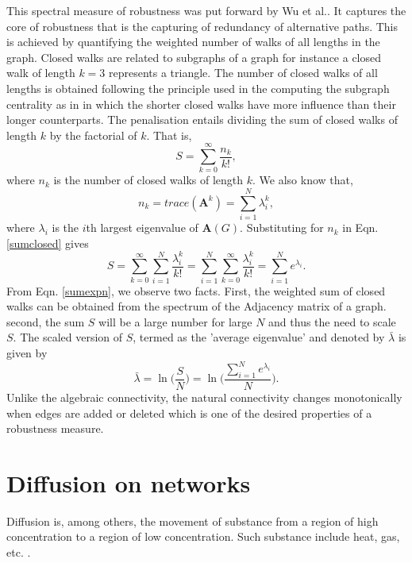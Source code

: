 \documentclass[10pt,a4paper]{article}
\begin{document}
\begin{enumerate}
		This spectral measure of robustness was put forward by Wu et al.\citep{wu2564spectral}. It captures the core of robustness that is the capturing of redundancy of alternative paths. This is achieved by quantifying the weighted number of walks of all lengths in the graph. Closed walks are related to subgraphs of a graph for instance a closed walk of length $k=3$ represents a triangle. The number of closed walks of all lengths is obtained following the principle used in the computing the subgraph centrality as in \citep{estrada2011structure} in which the shorter closed walks have more influence than their longer counterparts. The penalisation entails dividing the sum of closed walks of length $k$ by the factorial of $k$. That is,  
		\begin{equation}
		S = \sum_{k=0}^{\infty} \frac{n_k}{k!},
		\label{sumclosed}
		\end{equation} 
		where $n_k$ is the number of closed walks of length $k$. We also know that,
		\begin{equation}
		n_k = trace(\mathbf{A}^k) = \sum_{i=1}^{N} \lambda_{i} ^k,
		\end{equation}
		where $\lambda_i$ is the $i$th largest eigenvalue of $\mathbf{A}(G)$.
		Substituting for $n_k$ in Eqn.\ref{sumclosed} gives
		\begin{equation}
		S = \sum_{k=0}^{\infty} \sum_{i=1}^{N} \frac{\lambda_{i} ^k} {k!} =  \sum_{i=1}^{N}\sum_{k=0}^{\infty} \frac{\lambda_{i} ^k} {k!}= \sum_{i=1}^{N} e^{\lambda_i}.
		\label{sumexpn}
		\end{equation}
		From Eqn. \ref{sumexpn}, we observe two facts. First, the weighted sum of closed walks can be obtained from the spectrum of the Adjacency matrix of a graph. second, the sum $S$ will be a large number for large $N$ and  thus the need to scale $S$. The scaled version of $S$, termed as the 'average eigenvalue' and denoted by $\bar{\lambda}$  is given by
		\begin{equation}
		\bar{\lambda} = \ln \big( \frac{S}{N}\big) = \ln \Big( \frac{\sum_{i=1}^{N} e^{\lambda_i}}{N} \Big).
		\end{equation}
		Unlike the algebraic connectivity, the natural connectivity changes monotonically when edges are added or deleted which is one of the desired properties of a robustness measure.
	\end{enumerate}
	
    \section{Diffusion on networks}
    Diffusion is, among others, the movement of substance from a region of high concentration to a region of low concentration. Such substance include heat, gas, etc. \citep{newman2010networks}.
    
\end{document}
